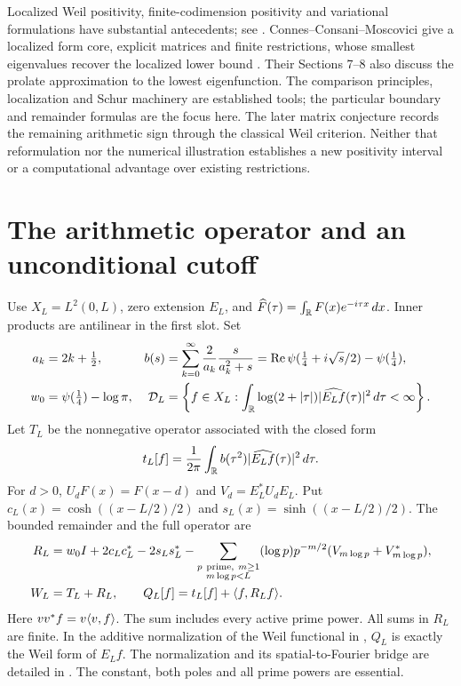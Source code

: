 Localized Weil positivity, finite-codimension positivity and variational
formulations have substantial antecedents; see \cite[Section 1]{Suzuki}.
Connes--Consani--Moscovici give a localized form core, explicit matrices and
finite restrictions, whose smallest eigenvalues recover the localized
lower bound \cite[Proposition 3.4 and Sections 4--5]{CCM}.
Their Sections 7--8 also discuss the prolate approximation to the lowest
eigenfunction. The comparison principles, localization and Schur machinery
are established tools; the particular boundary and remainder formulas are
the focus here. The later matrix conjecture records the remaining arithmetic
sign through the classical Weil criterion. Neither that reformulation nor
the numerical illustration establishes a new positivity interval or a
computational advantage over existing restrictions.

\section{The arithmetic operator and an unconditional cutoff}
Use $X_L=L^2(0,L)$, zero extension $E_L$, and
$\widehat F(\tau)=\int_\mathbb R F(x)e^{-i\tau x}\,dx$. Inner products are
antilinear in the first slot. Set
\begin{align}
a_k&=2k+\tfrac12,&
b(s)&=\sum_{k=0}^{\infty}\frac2{a_k}\frac{s}{a_k^2+s}
=\operatorname{Re}\psi(\tfrac14+i\sqrt{s}/2)-\psi(\tfrac14),\label{eq:b}\\
w_0&=\psi(\tfrac14)-\log\pi,&
\mathcal D_L&=\left\{f\in X_L:
\int_\mathbb R\log(2+|\tau|)|\widehat{E_Lf}(\tau)|^2\,d\tau<\infty\right\}.
\end{align}
Let $T_L$ be the nonnegative operator associated with the closed form
\[
t_L[f]=\frac1{2\pi}\int_\mathbb R b(\tau^2)|\widehat{E_Lf}(\tau)|^2\,d\tau.
\]
For $d>0$, $U_dF(x)=F(x-d)$ and $V_d=E_L^*U_dE_L$. Put
$c_L(x)=\cosh((x-L/2)/2)$ and $s_L(x)=\sinh((x-L/2)/2)$.
The bounded remainder and the full operator are
\begin{align}
R_L={}&w_0I+2c_Lc_L^*-2s_Ls_L^*
-\sum_{\substack{p\ \mathrm{prime},\ m\ge1\\m\log p<L}}
 (\log p)p^{-m/2}(V_{m\log p}+V_{m\log p}^*),\label{eq:remainder}\\
W_L={}&T_L+R_L,\qquad Q_L[f]=t_L[f]+\langle f,R_Lf\rangle.\label{eq:weil}
\end{align}
Here $vv^*f=v\langle v,f\rangle$. The sum includes every active prime power.
All sums in $R_L$ are finite. In the additive normalization of the Weil
functional in \cite[Section 1.1]{Suzuki}, $Q_L$ is exactly the Weil form of
$E_Lf$. The normalization and its spatial-to-Fourier bridge are detailed in
\cite[Sections 2--3]{Companion}. The constant, both poles and all prime
powers are essential.

